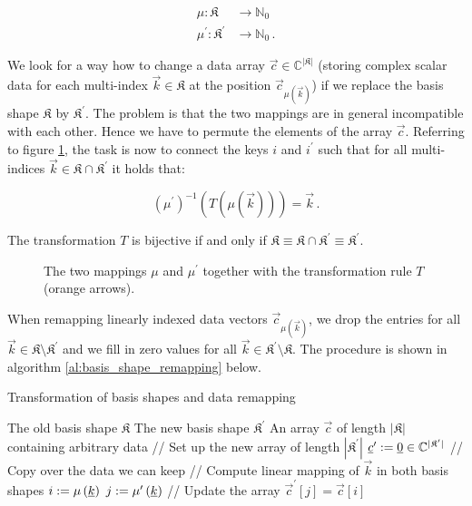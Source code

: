 \begin{align*}
  \mu: \mathfrak{K} & \rightarrow \mathbb{N}_0 \\
  \mu^\prime: \mathfrak{K}^\prime & \rightarrow \mathbb{N}_0 \,.
\end{align*}

We look for a way how to change a data array $\vec{c} \in \mathbb{C}^{|\mathfrak{K}|}$
(storing complex scalar data for each multi-index $\vec{k} \in \mathfrak{K}$
at the position $\vec{c}_{\mu(\vec{k})}$) if we replace the basis shape $\mathfrak{K}$
by $\mathfrak{K}^\prime$. The problem is that the two mappings are in general
incompatible with each other. Hence we have to permute the elements of the array $\vec{c}$.
Referring to figure \ref{fig:map}, the task is now to connect the keys $i$ and
$i^\prime$ such that for all multi-indices $\vec{k} \in \mathfrak{K} \cap \mathfrak{K}^\prime$
it holds that:

\begin{equation*}
  \left(\mu^\prime\right)^{-1} \left( T\left( \mu\left(\vec{k}\right) \right) \right) = \vec{k} \,.
\end{equation*}

The transformation $T$ is bijective if and only if
$\mathfrak{K} \equiv \mathfrak{K} \cap \mathfrak{K}^\prime \equiv \mathfrak{K}^\prime$.

\begin{figure}
  \centering
  
  \caption[Basis shape transformation mapping]
  {The two mappings $\mu$ and $\mu^\prime$ together with the transformation rule $T$ (orange arrows).}
  \label{fig:map}
\end{figure}

When remapping linearly indexed data vectors $\vec{c}_{\mu\left(\vec{k}\right)}$,
we drop the entries for all $\vec{k} \in \mathfrak{K} \setminus \mathfrak{K}^\prime$
and we fill in zero values for all $\vec{k} \in \mathfrak{K}^\prime \setminus \mathfrak{K}$.
The procedure is shown in algorithm \ref{al:basis_shape_remapping} below.

\begin{algorithm}
  \caption{Transformation of basis shapes and data remapping}
  \label{al:basis_shape_remapping}
  \begin{algorithmic}
    \REQUIRE The old basis shape $\mathfrak{K}$
    \REQUIRE The new basis shape $\mathfrak{K}^\prime$
    \REQUIRE An array $\vec{c}$ of length $|\mathfrak{K}|$ containing arbitrary data
    \STATE // Set up the new array of length $|\mathfrak{K}^\prime|$
    \STATE $\underline{c}^\prime := \underline{0} \in \mathbb{C}^{|\mathfrak{K}^\prime|}$
    \STATE // Copy over the data we can keep
      \STATE // Compute linear mapping of $\vec{k}$ in both basis shapes
      \STATE $i := \mu\left(\underline{k}\right)$
      \STATE $j := \mu^\prime\left(\underline{k}\right)$
      \STATE // Update the array
      \STATE $\vec{c}^\prime\left[j\right] = \vec{c}\left[i\right]$
    \ENDFOR
  \end{algorithmic}
\end{algorithm}

